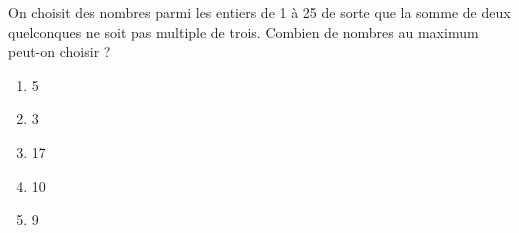 On choisit des nombres parmi les entiers de 1 à 25 de sorte que la
somme de deux quelconques ne soit pas multiple de trois. Combien de
nombres au maximum peut-on choisir ?
\begin{multicols}{5}
  \begin{enumerate}[A/]
  \item 5
  \item 3
  \item 17
  \item 10
  \item 9
  \end{enumerate}
\end{multicols}